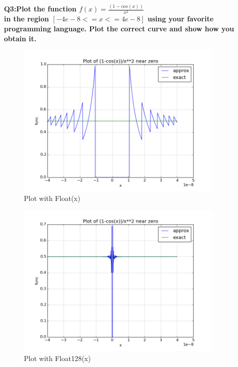\documentclass{article}
\begin{document}
\textbf{Q3:Plot the function
$f(x)=\frac{(1 − cos(x))}{x^2}$
\\
in the region $[-4e-8 <= x <= 4e-8]$ using your favorite programming language. Plot the correct curve and show how you obtain it.}
\newline
\begin{figure}[H] \label{figure}
\includegraphics[width=10cm]{three.png}
\caption{Plot with Float(x)}
\label{figure:}
\end{figure}

\begin{figure}[H] \label{figure}
\includegraphics[width=10cm]{three_2.png}
\caption{Plot with Float128(x)}
\label{figure:}
\end{figure}
\end{document}
